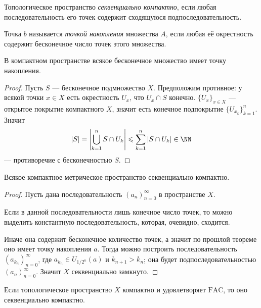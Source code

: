 \documentclass[12pt,a4paper]{article}
\newcommand{\FAC}{\ensuremath{\mathrm{FAC}}\xspace}
\begin{document}
    \begin{definition}
        Топологическое пространство \emph{секвенциально компактно}, если любая последовательность его точек содержит сходящуюся подпоследовательность.
    \end{definition}

    \begin{definition}
        Точка $b$ называется \emph{точкой накопления} множества $A$, если любая её окрестность содержит бесконечное число точек этого множества.
    \end{definition}

    \begin{theorem}
        В компактном пространстве всякое бесконечное множество имеет точку накопления.
    \end{theorem}

    \begin{proof}
        Пусть $S$ --- бесконечное подмножество $X$. Предположим противное: у всякой точки $x \in X$ есть окрестность $U_x$, что $U_x \cap S$ конечно. $\{U_x\}_{x \in X}$ --- открытое покрытие компактного $X$, значит есть конечное подпокрытие $\{U_{x_k}\}_{k=1}^n$. Значит
        \[|S| = \left|\bigcup_{k=1}^n S \cap U_k\right| \leqslant \sum_{k=1}^n |S \cap U_k| \in \NN\]
        --- противоречие с бесконечностью $S$.
    \end{proof}

    \begin{theorem}\label{compact_tern_part12_theorem}
        Всякое компактное метрическое пространство секвенциально компактно.
    \end{theorem}

    \begin{proof}
        Пусть дана последовательность $(a_n)_{n=0}^\infty$ в пространстве $X$.
        
        Если в данной последовательности лишь конечное число точек, то можно выделить константную последовательность, которая, очевидно, сходится.
        
        Иначе она содержит бесконечное количество точек, а значит по прошлой теореме оно имеет точку накопления $a$. Тогда можно построить последовательность $(a_{k_n})_{n=0}^\infty$, где $a_{k_n} \in U_{1/2^n}(a)$ и $k_{n+1} > k_n$; она будет подпоследовательностью $(a_n)_{n=0}^\infty$. Значит $X$ секвенциально замкнуто.
    \end{proof}

    \begin{theorem}[обобщение]\label{compact+FAC=>sequentially_compact_theorem}
        Если топологическое пространство $X$ компактно и удовлетворяет $\FAC$, то оно секвенциально компактно.
    \end{theorem}
\end{document}
